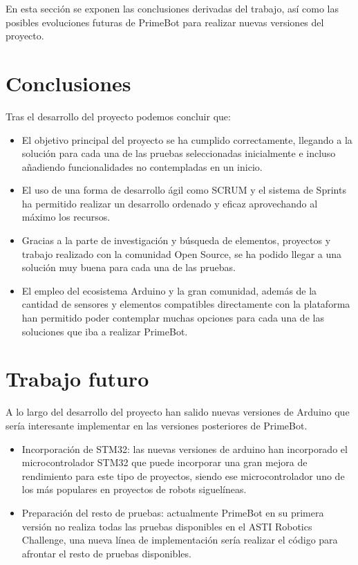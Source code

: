 
En esta sección se exponen las conclusiones derivadas del trabajo, así como las posibles evoluciones futuras de PrimeBot para realizar nuevas versiones del proyecto.

\section{Conclusiones}\label{conclusiones}

Tras el desarrollo del proyecto podemos concluir que:

\begin{itemize}
\tightlist
\item
 El objetivo principal del proyecto se ha cumplido correctamente, llegando a la solución para cada una de las pruebas seleccionadas inicialmente e incluso añadiendo funcionalidades no contempladas en un inicio.
\item
 El uso de una forma de desarrollo ágil como SCRUM y el sistema de Sprints ha permitido realizar un desarrollo ordenado y eficaz aprovechando al máximo los recursos.
\item
 Gracias a la parte de investigación y búsqueda de elementos, proyectos y trabajo realizado con la comunidad Open Source, se ha podido llegar a una solución muy buena para cada una de las pruebas.
\item
 El empleo del ecosistema Arduino y la gran comunidad, además de la cantidad de sensores y elementos compatibles directamente con la plataforma han permitido poder contemplar muchas opciones para cada una de las soluciones que iba a realizar PrimeBot.
\end{itemize}

\section{Trabajo futuro}\label{trabajo-futuro}

A lo largo del desarrollo del proyecto han salido nuevas versiones de Arduino que sería interesante implementar en las versiones posteriores de PrimeBot.

\begin{itemize}
\tightlist
\item
 Incorporación de STM32: las nuevas versiones de arduino han incorporado el microcontrolador STM32 que puede incorporar una gran mejora de rendimiento para este tipo de proyectos, siendo ese microcontrolador uno de los más populares en proyectos de robots siguelíneas.
\item
 Preparación del resto de pruebas: actualmente PrimeBot en su primera versión no realiza todas las pruebas disponibles en el ASTI Robotics Challenge, una nueva línea de implementación sería realizar el código para afrontar el resto de pruebas disponibles.
\end{itemize}
